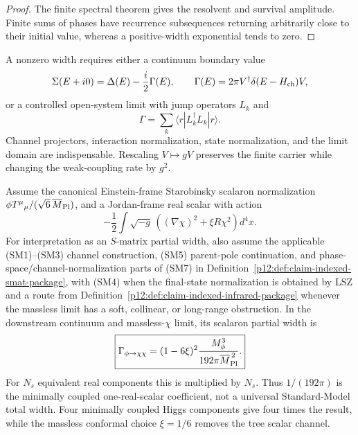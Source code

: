 \documentclass[12pt,a4paper]{article}
\begin{document}
\begin{proof}
The finite spectral theorem gives the resolvent and survival amplitude.
Finite sums of phases have recurrence subsequences returning arbitrarily
close to their initial value, whereas a positive-width exponential tends to
zero.
\end{proof}

\begin{corollary}
\label{p6:cor:required-rate-data}
A nonzero width requires either a continuum boundary value
\[
\Sigma(E+i0)
=
\Delta(E)-\frac i2\Gamma(E),
\qquad
\Gamma(E)=2\pi V^\dagger\delta(E-H_{\rm ch})V,
\]
or a controlled open-system limit with jump operators \(L_k\) and
\[
\Gamma
=
\sum_k\langle r|L_k^\dagger L_k|r\rangle .
\]
Channel projectors, interaction normalization, state normalization, and the
limit domain are indispensable.  Rescaling \(V\mapsto gV\) preserves the
finite carrier while changing the weak-coupling rate by \(g^2\).
\end{corollary}

\begin{proposition}[Meaning of \(1/(192\pi)\)]
\label{p6:prop:one-real-scalar-interface}
Assume the canonical Einstein-frame Starobinsky scalaron normalization
\(\phi T^\mu{}_\mu/(\sqrt6\,\overline M_{\rm Pl})\), and a Jordan-frame real
scalar with action
\[
-\frac12\int\sqrt{-g}\,
\left((\nabla\chi)^2+\xi R\chi^2\right)d^4x .
\]
For interpretation as an \(S\)-matrix partial width, also assume the applicable
\textnormal{(SM1)--(SM3)} channel construction, \textnormal{(SM5)} parent-pole
continuation, and phase-space/channel-normalization parts of
\textnormal{(SM7)} in
Definition~\ref{p12:def:claim-indexed-smat-package}, with
\textnormal{(SM4)} when the final-state normalization is obtained by LSZ and a
route from Definition~\ref{p12:def:claim-indexed-infrared-package} whenever the
massless limit has a soft, collinear, or long-range obstruction.
In the downstream continuum and massless-\(\chi\) limit, its scalaron partial
width is
\[
\boxed{
\Gamma_{\phi\to\chi\chi}
=
(1-6\xi)^2
\frac{M_\phi^3}{192\pi\overline M_{\rm Pl}^{\,2}}.
}
\]
For \(N_s\) equivalent real components this is multiplied by \(N_s\).
Thus \(1/(192\pi)\) is the minimally coupled one-real-scalar coefficient,
not a universal Standard-Model total width.  Four minimally coupled Higgs
components give four times the result, while the massless conformal choice
\(\xi=1/6\) removes the tree scalar channel.
\end{proposition}
\end{document}
